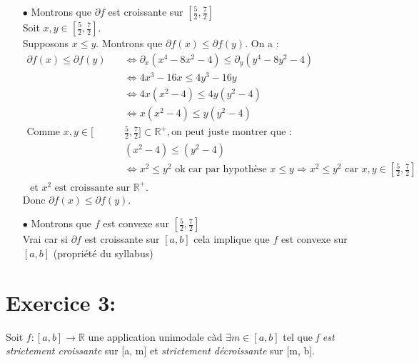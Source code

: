 \documentclass[a4paper, 12pt]{article}
\begin{document}
\begin{itemize}
	\item[$\bullet$] Montrons que $\partial f $ est croissante sur $[\frac{5}{2},\frac{7}{2}]$\\
		Soit $x,y \in [\frac{5}{2},\frac{7}{2}]$.\\
		Supposons $x \leqslant y$.
		Montrons que $\partial f(x) \leqslant \partial f(y)$.
		On a :
		\begin{align*}
		\partial f(x) \leqslant \partial f(y)& \Leftrightarrow \partial_x (x^4-8x^2-4) \leqslant \partial_y (y^4-8y^2-4)\\
		& \Leftrightarrow 4x^3-16x \leqslant 4y^3-16y\\
		& \Leftrightarrow 4x(x^2-4)\leqslant 4y(y^2-4)\\
		& \Leftrightarrow x(x^2-4) \leqslant y(y^2-4)\\
		\text{Comme }x,y\in[&\frac{5}{2},\frac{7}{2}]\subset\mathbb{R}^+,\text{on peut juste montrer que :} \\
		&(x^2-4) \leqslant (y^2-4)\\
		&\Leftrightarrow x^2\leqslant y^2 \text{ ok car par hypothèse } x\leqslant y \Rightarrow x^2 \leqslant y^2 \text{ car } x,y\in [\frac{5}{2},\frac{7}{2}] \\ \text{ et } x^2 \text{ est croissante sur  }\mathbb{R}^+.
		\end{align*}
	Donc $\partial f(x) \leqslant \partial f(y)$.
	\item[$\bullet$] Montrons que $f$ est convexe sur $[\frac{5}{2},\frac{7}{2}]$\\
	Vrai car si $\partial f$ est croissante sur $[a,b]$ cela implique que $f$ est convexe sur $[a,b]$ (propriété du syllabus)
\end{itemize}




\section{Exercice 3:}
Soit \( f : [a, b] \rightarrow \mathbb{R} \) une application unimodale càd \( \exists m \in [a, b] \) tel que \emph{f est strictement croissante} sur [a, m] et \emph{strictement décroissante} sur [m, b].
\end{document}
